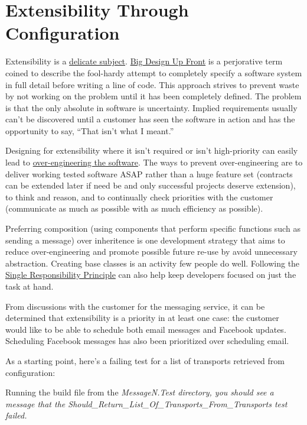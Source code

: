 
\chapter{Extensibility Through Configuration}

Extensibility is a \href{http://webarya.wordpress.com/2010/05/28/my-ten-development-principles/}{delicate subject}. \href{http://c2.com/xp/BigDesignUpFront.html}{Big Design Up Front} is a perjorative term coined to describe the fool-hardy attempt to completely specify a software system in full detail before writing a line of code. This approach strives to prevent waste by not working on the problem until it has been completely defined. The problem is that the only absolute in software is uncertainty. Implied requirements usually can't be discovered until a customer has seen the software in action and has the opportunity to say, ``That isn't what I meant.'' 

Designing for extensibility where it isn't required or isn't high-priority can easily lead to \href{http://blog.digitalstruct.com/2008/02/17/over-engineering-software/}{over-engineering the software}. The ways to prevent over-engineering are to deliver working tested software ASAP rather than a huge feature set (contracts can be extended later if need be and only successful projects deserve extension), to think and reason, and to continually check priorities with the customer (communicate as much as possible with as much efficiency as possible).

Preferring composition (using components that perform specific functions such as sending a message) over inheritence is one development strategy that aims to reduce over-engineering and promote possible future re-use by avoid unnecessary abstraction. Creating base classes is an activity few people do well. Following the \href{http://www.objectmentor.com/resources/articles/srp.pdf}{Single Responsibility Principle} can also help keep developers focused on just the task at hand.

From discussions with the customer for the messaging service, it can be determined that extensibility is a priority in at least one case: the customer would like to be able to schedule both email messages and Facebook updates. Scheduling Facebook messages has also been prioritized over scheduling email.

As a starting point, here's a failing test for a list of transports retrieved from configuration:



Running the build file from the \em MessageN.Test \em directory, you should see a message that the \em Should\_Return\_List\_Of\_Transports\_From\_Transports \em test failed.